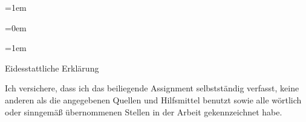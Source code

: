 \documentclass[a4paper,12pt]{article}
\newif\iflistoffigures
\newif\iflistoftables
\newif\ifacronym
\begin{document}
	
\parskip=1em
\parindent=0cm



\normalsize

\begin{spacing}{1.0} %
\parskip=0em
\newpage

\setcounter{tocdepth}{2}
\tableofcontents 
\newpage

\iflistoffigures
\listoffigures 
\newpage
\fi

\iflistoftables
\listoftables 
\newpage
\fi

\ifacronym

\fi

\parskip=1em
\end{spacing} 

\clearpage

\setcounter{romanPagenumber}{\value{page}} %


\pagestyle{fancy}
\fancyhead{}
\fancyhead[LO,RE]{\textsc{\Titel}}
\fancyhead[RO,LE]{\thepage}
\fancyfoot[CO,CE]{}
\setlength{\headheight}{15pt}



\begin{spacing}{1.5} %







\end{spacing}

\clearpage

\pagestyle{plain}
\setcounter{page}{\theromanPagenumber}
\renewcommand{\refname}{Literatur-- und Quellenverzeichnis}


\onehalfspacing
\clearpage

\pagestyle{empty} 
\thispagestyle{empty}

\begin{center}
{\Large Eidesstattliche Erklärung}
\vspace*{4cm}\end{center}
\noindent
Ich versichere, dass ich das beiliegende Assignment selbstständig verfasst, keine anderen als die angegebenen Quellen und Hilfsmittel benutzt sowie alle wörtlich oder sinngemäß übernommenen Stellen in der Arbeit gekennzeichnet habe. 
\vspace{3cm}
\end{document}
